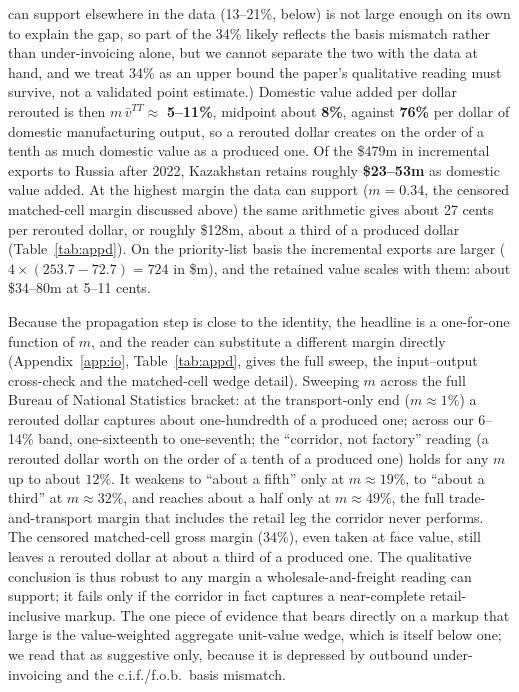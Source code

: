 \documentclass[12pt]{article}
\begin{document}
can support elsewhere in the data (13--21\%, below) is not large enough on its own to explain
the gap, so part of the 34\% likely reflects the basis mismatch rather than under-invoicing
alone, but we cannot separate the two with the data at hand, and we treat 34\% as an upper
bound the paper's qualitative reading must survive, not a validated point estimate.)
Domestic value added per dollar rerouted is then $m\,\bar v^{TT} \approx$ \textbf{5--11\%},
midpoint about \textbf{8\%}, against \textbf{76\%} per dollar of domestic manufacturing
output, so a rerouted dollar creates on the order of a tenth as much domestic value as a
produced one. Of the \$479m in incremental exports to Russia after 2022, Kazakhstan retains
roughly \textbf{\$23--53m} as domestic value added. At the highest margin the data can support ($m = 0.34$, the censored matched-cell margin discussed above) the same arithmetic gives about 27 cents per rerouted dollar, or roughly \$128m, about a third of a produced dollar (Table~\ref{tab:appd}). On the priority-list basis the incremental exports are larger ($4 \times (253.7 - 72.7) = 724$ in \$m), and the retained value scales with them: about \$34--80m at 5--11 cents.

Because the propagation step is close to the identity, the headline is a one-for-one function
of $m$, and the reader can substitute a different margin directly (Appendix~\ref{app:io},
Table~\ref{tab:appd}, gives the full sweep, the input--output cross-check and the matched-cell
wedge detail).
Sweeping $m$ across the full
Bureau of National Statistics bracket: at the transport-only end ($m \approx 1\%$) a rerouted
dollar captures about one-hundredth of a produced one; across our 6--14\% band, one-sixteenth
to one-seventh; the ``corridor, not factory'' reading (a rerouted dollar worth on the order of
a tenth of a produced one) holds for any $m$ up to about $12\%$. It weakens to ``about a fifth''
only at $m \approx 19\%$, to ``about a third'' at $m \approx 32\%$, and reaches about a half
only at $m \approx 49\%$, the full trade-and-transport margin that includes the retail leg the
corridor never performs. The censored matched-cell gross margin ($34\%$), even taken at face value, still
leaves a rerouted dollar at about a third of a produced one. The qualitative conclusion is thus
robust to any margin a wholesale-and-freight reading can support; it fails only if the corridor
in fact captures a near-complete retail-inclusive markup. The one piece of evidence that bears
directly on a markup that large is the value-weighted aggregate unit-value wedge, which is
itself below one; we read that as suggestive only, because it is depressed by
outbound under-invoicing and the c.i.f./f.o.b.\ basis mismatch.
\end{document}
